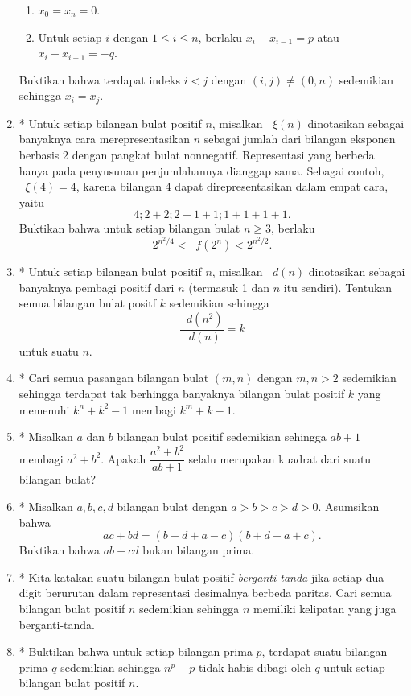 \documentclass[12pt]{article}
\newcommand*\func[2]{\mathop{}\!{#1}{\left({#2}\right)}}
\begin{document}
\begin{enumerate}[leftmargin=*]
		\begin{enumerate}
			\item $ x_{0} = x_{n} = 0 $.
			\item Untuk setiap $ i $ dengan $ 1 \leq i \leq n $, berlaku $ x_{i} - x_{i - 1} = p $ atau $ x_{i} - x_{i - 1} = -q $.
		\end{enumerate}
		Buktikan bahwa terdapat indeks $ i < j $ dengan $ \left(i, j\right) \ne \left(0, n\right) $ sedemikian sehingga $ x_{i} = x_{j} $.
		\item* Untuk setiap bilangan bulat positif $ n $, misalkan $ \func{\xi}{n} $ dinotasikan sebagai banyaknya cara merepresentasikan $ n $ sebagai jumlah dari bilangan eksponen berbasis 2 dengan pangkat bulat nonnegatif. Representasi yang berbeda hanya pada penyusunan penjumlahannya dianggap sama. Sebagai contoh, $ \func{\xi}{4} = 4 $, karena bilangan 4 dapat direpresentasikan dalam empat cara, yaitu
		\[ 4; 2 + 2; 2 + 1 + 1; 1 + 1 + 1 + 1. \]
		Buktikan bahwa untuk setiap bilangan bulat $ n \geq 3 $, berlaku
		\[ 2^{n^{2}/4} < \func{f}{2^{n}} < 2^{n^{2}/2}. \]
		\item* Untuk setiap bilangan bulat positif $ n $, misalkan $ \func{d}{n} $ dinotasikan sebagai banyaknya pembagi positif dari $ n $ (termasuk 1 dan $ n $ itu sendiri). Tentukan semua bilangan bulat positf $ k $ sedemikian sehingga
		\[ \frac{\func{d}{n^{2}}}{\func{d}{n}} = k \]
		untuk suatu $ n $.
		\item* Cari semua pasangan bilangan bulat $ \left(m, n\right) $ dengan $ m, n > 2 $ sedemikian sehingga terdapat tak berhingga banyaknya bilangan bulat positif $ k $ yang memenuhi $ k^{n} + k^{2} - 1 $ membagi $ k^{m} + k - 1 $.
		\item* Misalkan $ a $ dan $ b $ bilangan bulat positif sedemikian sehingga $ ab + 1 $ membagi $ a^{2} + b^{2} $. Apakah $ \dfrac{a^{2} + b^{2}}{ab + 1} $ selalu merupakan kuadrat dari suatu bilangan bulat?
		\item* Misalkan $ a, b, c, d $ bilangan bulat dengan $ a > b > c > d > 0 $. Asumsikan bahwa
		\[ ac + bd = \left(b + d + a - c\right)\left(b + d - a + c\right). \]
		Buktikan bahwa $ ab + cd $ bukan bilangan prima.
		\item* Kita katakan suatu bilangan bulat positif \textit{berganti-tanda} jika setiap dua digit berurutan dalam representasi desimalnya berbeda paritas. Cari semua bilangan bulat positif $ n $ sedemikian sehingga $ n $ memiliki kelipatan yang juga berganti-tanda.
		\item* Buktikan bahwa untuk setiap bilangan prima $ p $, terdapat suatu bilangan prima $ q $ sedemikian sehingga $ n^{p} - p $ tidak habis dibagi oleh $ q $ untuk setiap bilangan bulat positif $ n $.

\end{enumerate}
\end{document}
